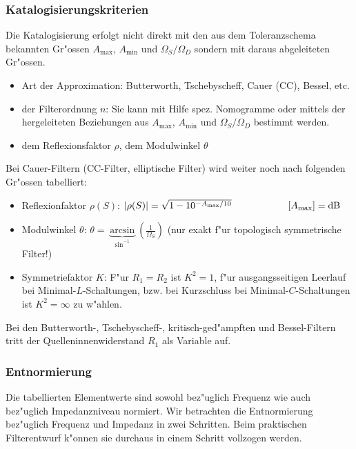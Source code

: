 \subsubsection{Katalogisierungskriterien}
Die Katalogisierung erfolgt nicht direkt mit den aus dem Toleranzschema 
bekannten Gr"ossen $A_{\max}$, $A_{\min}$ und $\Omega_S/\Omega_D$ sondern mit
daraus abgeleiteten Gr"ossen.
\begin{itemize}
\item  Art der Approximation: Butterworth, Tschebyscheff, Cauer (CC), Bessel,  etc.
\item  der Filterordnung $n$:  Sie kann mit Hilfe spez. Nomogramme oder mittels der hergeleiteten 
  Beziehungen aus $A_{\max}$, $A_{\min}$ und $\Omega_S/\Omega_D$ bestimmt werden.
\item  dem Reflexionsfaktor $\rho $, dem Modulwinkel $\theta $
\end{itemize} 
Bei Cauer-Filtern (CC-Filter, elliptische Filter)  wird weiter noch nach folgenden Gr"ossen tabelliert:
\begin{itemize}
\item  Reflexionfaktor $\rho(S)$: $| \rho(S) |=\sqrt{1-10^{-A_{\max}/10}}\hspace*{2cm}\left[ A_{\max} \right]={\rm dB}$
\item  Modulwinkel $\theta $: $\theta=\underbrace{\arcsin}_{\sin^{-1}} \left(\frac{1}{\Omega_S}\right)$ (nur exakt f"ur topologisch symmetrische Filter!)
\item  Symmetriefaktor $K$:
  F"ur $R_1=R_2$ ist $K^2=1$, f"ur ausgangsseitigen Leerlauf 
  bei Minimal-$L$-Schaltungen, bzw. bei Kurzschluss bei 
  Minimal-$C$-Schaltungen ist $K^2=\infty $ zu
  w"ahlen.
\end{itemize}
\nit Bei den Butterworth-, Tschebyscheff-, kritisch-ged"ampften und Bessel-Filtern tritt der
Quelleninnenwiderstand $R_1$ als Variable auf.
\subsubsection{Entnormierung}
Die tabellierten Elementwerte sind sowohl bez"uglich Frequenz wie auch bez"uglich
Impedanzniveau normiert. Wir betrachten die Entnormierung bez"uglich
Frequenz und Impedanz in zwei Schritten. Beim praktischen
Filterentwurf k"onnen sie durchaus in einem Schritt vollzogen
werden.
